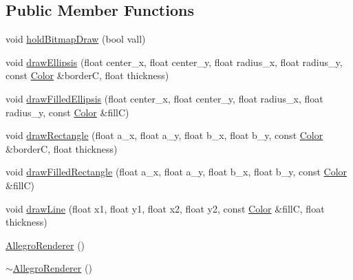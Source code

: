 \subsection*{Public Member Functions}
\begin{DoxyCompactItemize}
\item 
void \hyperlink{classZeta_1_1AllegroRenderer_aea34760ff1fd46b7e38c5e3491fc9e13}{hold\+Bitmap\+Draw} (bool vall)
\item 
void \hyperlink{classZeta_1_1AllegroRenderer_acc295b7409ffe9a03ce89150092d9e64}{draw\+Ellipsis} (float center\+\_\+x, float center\+\_\+y, float radius\+\_\+x, float radius\+\_\+y, const \hyperlink{classZeta_1_1Color}{Color} \&border\+C, float thickness)
\item 
void \hyperlink{classZeta_1_1AllegroRenderer_ad12e55e570eae5ea500657fdcb14c24e}{draw\+Filled\+Ellipsis} (float center\+\_\+x, float center\+\_\+y, float radius\+\_\+x, float radius\+\_\+y, const \hyperlink{classZeta_1_1Color}{Color} \&fill\+C)
\item 
void \hyperlink{classZeta_1_1AllegroRenderer_a9e82ac53fe00a8fffcfab1b8ed069bf1}{draw\+Rectangle} (float a\+\_\+x, float a\+\_\+y, float b\+\_\+x, float b\+\_\+y, const \hyperlink{classZeta_1_1Color}{Color} \&border\+C, float thickness)
\item 
void \hyperlink{classZeta_1_1AllegroRenderer_ab8991aa90c1dc6e781f72e980ffcbf7f}{draw\+Filled\+Rectangle} (float a\+\_\+x, float a\+\_\+y, float b\+\_\+x, float b\+\_\+y, const \hyperlink{classZeta_1_1Color}{Color} \&fill\+C)
\item 
void \hyperlink{classZeta_1_1AllegroRenderer_a391bc752b95b7305b91e66178078e40e}{draw\+Line} (float x1, float y1, float x2, float y2, const \hyperlink{classZeta_1_1Color}{Color} \&fill\+C, float thickness)
\item 
\hyperlink{classZeta_1_1AllegroRenderer_a55714e4509781eb64b932cf3d872fece}{Allegro\+Renderer} ()
\item 
\hyperlink{classZeta_1_1AllegroRenderer_a1f3aaed20d689b8939bde84bac546c77}{$\sim$\+Allegro\+Renderer} ()
\end{DoxyCompactItemize}


